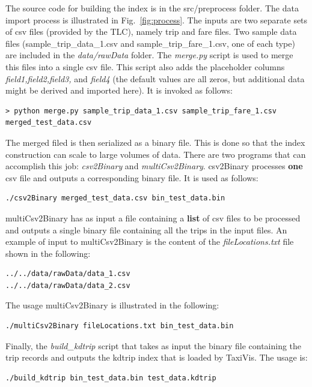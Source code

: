 \documentclass[12pt]{article}
\begin{document}
The source code for building the index is in the src/preprocess
folder. The data import process is illustrated in
Fig.~\ref{fig:process}.
%
The inputs are two separate sets of csv files (provided by the TLC), namely trip and fare files.
%
Two sample data files (sample\_trip\_data\_1.csv and sample\_trip\_fare\_1.csv, one of each type) are included in the \emph{data/rawData} folder.
%
The \emph{merge.py} script is used to merge this files into a single
csv file. This script also adds the placeholder columns \emph{field1,field2,field3,} and \emph{field4} (the default values are all zeros, but additional data might be derived and imported here).
%
It is invoked as follows:
\lstset{language=bash}
\begin{lstlisting}
> python merge.py sample_trip_data_1.csv sample_trip_fare_1.csv merged_test_data.csv
\end{lstlisting}

%
The merged filed is then serialized as a binary file. This is done so
that the index construction can scale to large volumes of data. There
are two programs that can accomplish this job: \emph{csv2Binary} and
\emph{multiCsv2Binary}. 
csv2Binary processes {\bf one} csv file and outputs a
corresponding binary file. It is used as follows:
\lstset{language=bash}
\begin{lstlisting}
./csv2Binary merged_test_data.csv bin_test_data.bin
\end{lstlisting}

multiCsv2Binary has as input a file containing a {\bf list} of csv files to be processed and outputs a single binary file containing all the trips in the input files. An example of input to multiCsv2Binary is the content of the \emph{fileLocations.txt} file shown in the following:
\lstset{language=xml}
\begin{lstlisting}
../../data/rawData/data_1.csv
../../data/rawData/data_2.csv
\end{lstlisting}

The usage multiCsv2Binary is illustrated in the following:
\lstset{language=bash}
\begin{lstlisting}
./multiCsv2Binary fileLocations.txt bin_test_data.bin
\end{lstlisting}

%
Finally, the \emph{build\_kdtrip} script that takes as input the binary file containing the trip records and outputs the kdtrip index that is loaded by TaxiVis. The usage is:
\lstset{language=bash}
\begin{lstlisting}
./build_kdtrip bin_test_data.bin test_data.kdtrip
\end{lstlisting}
\end{document}
